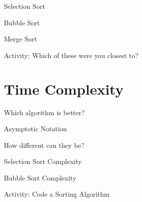 \documentclass[handout]{beamer}
\begin{document}
\begin{frame}{Selection Sort}
\end{frame}

\begin{frame}{Bubble Sort}
\end{frame}

\begin{frame}{Merge Sort}
\end{frame}

\begin{frame}{Activity: Which of these were you closest to?}
\end{frame}

\section{Time Complexity}
\begin{frame}{Which algorithm is better?}
\end{frame}

\begin{frame}{Asymptotic Notation}
\end{frame}

\begin{frame}{How different can they be?}
\end{frame}

\begin{frame}{Selection Sort Complexity}
\end{frame}

\begin{frame}{Bubble Sort Complexity}
\end{frame}


\begin{frame}{Activity: Code a Sorting Algorithm}
\end{frame}
\end{document}
